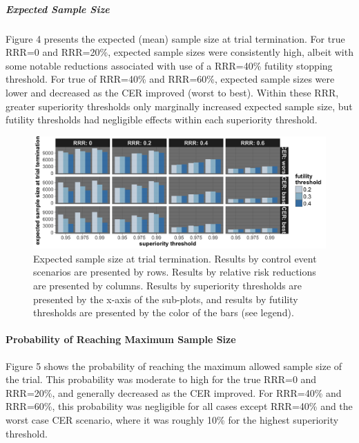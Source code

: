\documentclass[]{article}
\let\oldparagraph\paragraph
\renewcommand{\paragraph}[1]{\oldparagraph{#1}\mbox{}}
\let\oldsubparagraph\subparagraph
\renewcommand{\subparagraph}[1]{\oldsubparagraph{#1}\mbox{}}
\begin{document}
\hypertarget{expected-sample-size}{%
\subparagraph{Expected Sample Size}\label{expected-sample-size}}

Figure 4 presents the expected (mean) sample size at trial termination.
For true RRR=0 and RRR=20\%, expected sample sizes were consistently
high, albeit with some notable reductions associated with use of a
RRR=40\% futility stopping threshold. For true of RRR=40\% and RRR=60\%,
expected sample sizes were lower and decreased as the CER improved
(worst to best). Within these RRR, greater superiority thresholds only
marginally increased expected sample size, but futility thresholds had
negligible effects within each superiority threshold.

\begin{figure}
  \caption{Expected sample size at trial termination. Results by control event scenarios are presented by rows. Results
  by relative risk reductions are presented by columns. Results by superiority thresholds are presented by the x-axis of
  the sub-plots, and results by futility thresholds are presented by the color of the bars (see legend).}
  \includegraphics{../plots/stop_p1_new/Nt_sim_05_stopp1_new.png}
\end{figure}

\hypertarget{probability-of-reaching-maximum-sample-size}{%
\paragraph{Probability of Reaching Maximum Sample
Size}\label{probability-of-reaching-maximum-sample-size}}

Figure 5 shows the probability of reaching the maximum allowed sample
size of the trial. This probability was moderate to high for the true
RRR=0 and RRR=20\%, and generally decreased as the CER improved. For
RRR=40\% and RRR=60\%, this probability was negligible for all cases
except RRR=40\% and the worst case CER scenario, where it was roughly
10\% for the highest superiority threshold.
\end{document}
